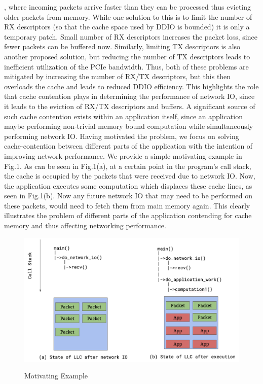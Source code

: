 \documentclass[sigconf,authorversion,noacm]{acmart}
\begin{document}
\cite{tootoonchian-resq}, where incoming packets arrive faster than they can be
processed thus evicting older packets from memory. While one solution to this is
to limit the number of RX descriptors (so that the cache space used by DDIO is
bounded) it is only a temporary patch. Small number of RX descriptors increases
the packet loss, since fewer packets can be buffered now. Similarly, limiting TX
descriptors is also another proposed solution, but reducing the number of TX
descriptors leads to inefficient utilization of the PCIe bandwidth. Thus, both
of these problems are mitigated by increasing the number of RX/TX descriptors,
but this then overloads the cache and leads to reduced DDIO efficiency. This
highlights the role that cache contention plays in determining the performance
of network IO, since it leads to the eviction of RX/TX descriptors and buffers.
A significant source of such cache contention exists within an application
itself, since an application maybe performing non-trivial memory bound
computation while simultaneously performing network IO. Having motivated the
problem, we focus on solving cache-contention between different parts of the
application with the intention of improving network performance. We provide a
simple motivating example in Fig.1. As can be seen in Fig.1(a), at a certain
point in the program's call stack, the cache is occupied by the packets that
were received due to network IO. Now, the application executes some computation
which displaces these cache lines, as seen in Fig.1(b). Now any future network
IO that may need to be performed on these packets, would need to fetch them from
main memory again. This clearly illustrates the problem of different parts of
the application contending for cache memory and thus affecting networking
performance.

\begin{figure}[h]
  \centering
  \includegraphics[width=\linewidth]{motivating_example}
    \label{fig:motivating}
    \vspace{-2em}
    \caption{Motivating Example}
\end{figure}
\end{document}
